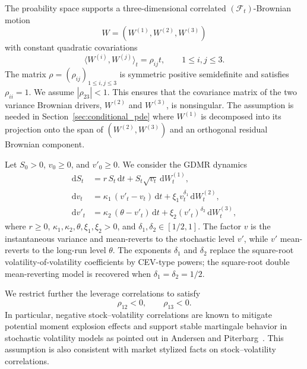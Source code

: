 \documentclass[pdflatex,sn-mathphys-num]{sn-jnl}
\theoremstyle{thmstyleone}%
\theoremstyle{thmstylethree}%
\newtheorem{assumption}[theorem]{Assumption}
\theoremstyle{thmstyletwo}%
\newcommand{\dd}{\mathrm d}
\newcommand{\Q}{\mathbb Q}
\newcommand{\F}{\mathcal F}
\begin{document}
The proability space supports a three-dimensional correlated $(\F_t)$-Brownian motion
$$
W=(W^{(1)},W^{(2)},W^{(3)})
$$
with constant quadratic covariations
$$
\langle W^{(i)},W^{(j)}\rangle_t=\rho_{ij}t,\qquad 1\le i,j\le 3.
$$
The matrix $\rho=(\rho_{ij})_{1\le i,j\le 3}$ is symmetric positive
semidefinite and satisfies $\rho_{ii}=1$. We assume $|\rho_{23}|<1$. This ensures that the covariance matrix of the two variance
Brownian drivers, $W^{(2)}$ and $W^{(3)}$, is nonsingular. The assumption is needed in Section~\ref{sec:conditional_pde} where $W^{(1)}$ is decomposed into its projection onto the span of
$(W^{(2)},W^{(3)})$ and an orthogonal residual Brownian component.

Let $S_0>0$, $v_0\ge0$, and $v'_0\ge0$. We consider the GDMR dynamics
\begin{equation}\label{eq:gdmr}
\begin{aligned}
\dd S_t &= r\,S_t\,\dd t + S_t\sqrt{v_t}\,\dd W^{(1)}_t,\\
\dd v_t &= \kappa_1\,(v'_t - v_t)\,\dd t + \xi_1 v_t^{\delta_1}\,\dd W^{(2)}_t,\\
\dd v'_t &= \kappa_2\,(\theta - v'_t)\,\dd t + \xi_2 (v'_t)^{\delta_2}\,\dd W^{(3)}_t,
\end{aligned}
\end{equation}
where $r\ge0$, $\kappa_1,\kappa_2,\theta,\xi_1,\xi_2>0$, and
$\delta_1,\delta_2\in[1/2,1]$. The factor $v$ is the instantaneous variance and
mean-reverts to the stochastic level $v'$, while $v'$ mean-reverts to the
long-run level $\theta$. The exponents $\delta_1$ and $\delta_2$ replace the
square-root volatility-of-volatility coefficients by CEV-type powers; the
square-root double mean-reverting model is recovered when
$\delta_1=\delta_2=1/2$.

We restrict further the leverage correlations to satisfy
\[
\rho_{12}<0,
\qquad
\rho_{13}<0.
\]
In particular, negative stock--volatility correlations are known to mitigate potential moment explosion effects and support stable martingale behavior in stochastic volatility models as pointed out in Andersen and Piterbarg~\cite{AndersenPiterbarg2007}. This assumption is also consistent with market stylized facts on stock--volatility  correlations.


\end{document}
